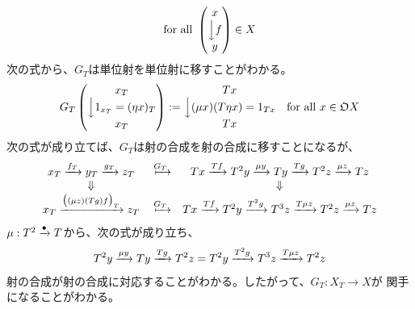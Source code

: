 {\begin{equation*}
\begin{split}
\begin{matrix}
		\end{matrix} \quad\text{for all }\begin{pmatrix}
			x \\ \Big\downarrow{f} \\ y
		\end{pmatrix}\in X
	\end{split}\end{equation*}
	次の式から、$G_T$は単位射を単位射に移すことがわかる。
	\begin{equation*}\begin{split}
		G_T \begin{pmatrix}
			x_T \\ \Big\downarrow{1_{x_T}=(\eta x)_T} \\ x_T
		\end{pmatrix} := \begin{matrix}
			Tx \\ \Big\downarrow{(\mu x)(T\eta x)=1_{Tx}} \\ Tx
		\end{matrix} \quad\text{for all } x\in\mathfrak{O} X
	\end{split}\end{equation*}
	次の式が成り立てば、$G_T$は射の合成を射の合成に移すことになるが、
	\begin{equation*}\begin{array}{ccc}
		x_T\xto{f_T}y_T\xto{g_T}z_T &\xmapsto{G_T}&
		Tx\xto{Tf}T^2y\xto{\mu y}Ty\xto{Tg}T^2z\xto{\mu z}Tz \\
		\Downarrow & & \Downarrow \\
		x_T\xto{\gplr{(\mu z)(Tg)f}_T}z_T &\xmapsto{G_T}&
		Tx\xto{Tf}T^2y\xto{T^2g}T^3z\xto{T\mu z}T^2z\xto{\mu z}Tz
	\end{array}\end{equation*}
	$\mu:T^2\xrightarrow[{}]{\bullet}T$から、次の式が成り立ち、
	\begin{equation*}\begin{split}
		T^2y\xrightarrow[{}]{\mu y}Ty\xrightarrow[{}]{Tg}T^2z = T^2y\xrightarrow[{}]{T^2g}T^3z\xrightarrow[{}]{T\mu z}T^2z
	\end{split}\end{equation*}
	射の合成が射の合成に対応することがわかる。したがって、$G_T:X_T\to X$が
	関手になることがわかる。

}
